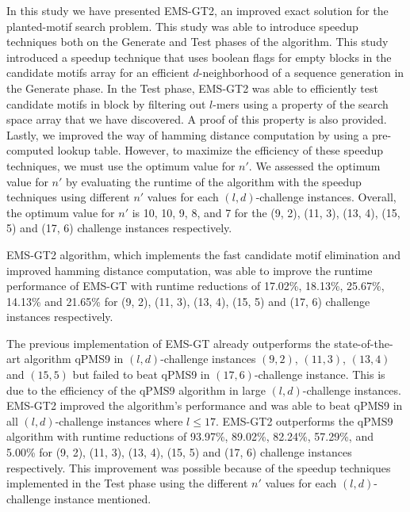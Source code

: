 
In this study we have presented EMS-GT2, an improved exact solution for the planted-motif search problem. This study was able to introduce speedup techniques both on the Generate and Test phases of the algorithm. This study introduced a speedup technique that uses boolean flags for empty blocks in the candidate motifs array for an efficient $d$-neighborhood of a sequence generation in the Generate phase. In the Test phase, EMS-GT2 was able to efficiently test candidate motifs in block by filtering out $l$-mers using a property of the search space array that we have discovered. A proof of this property is also provided. Lastly, we improved the way of hamming distance computation by using a pre-computed lookup table. However, to maximize the efficiency of these speedup techniques, we must use the optimum value for $n'$. We assessed the optimum value for $n'$ by evaluating the runtime of the algorithm with the speedup techniques using different $n'$ values for each $(l, d)$-challenge instances. Overall, the optimum value for $n'$ is 10, 10, 9, 8, and 7 for the (9, 2), (11, 3), (13, 4), (15, 5) and (17, 6) challenge instances respectively.

EMS-GT2 algorithm, which implements the fast candidate motif elimination and improved hamming distance computation, was able to improve the runtime performance of EMS-GT with runtime reductions of 17.02\%, 18.13\%, 25.67\%, 14.13\% and 21.65\% for (9, 2), (11, 3), (13, 4), (15, 5) and (17, 6) challenge instances respectively.

The previous implementation of EMS-GT already outperforms the state-of-the-art algorithm qPMS9 in $(l, d)$-challenge instances $(9, 2)$, $(11, 3)$, $(13, 4)$ and $(15, 5)$ but failed to beat qPMS9 in $(17, 6)$-challenge instance. This is due to the efficiency of the qPMS9 algorithm in large $(l, d)$-challenge instances. EMS-GT2 improved the algorithm's performance and was able to beat qPMS9 in all $(l, d)$-challenge instances where $l \leq 17$. EMS-GT2 outperforms the qPMS9 algorithm with runtime reductions of 93.97\%, 89.02\%, 82.24\%, 57.29\%, and 5.00\% for (9, 2), (11, 3), (13, 4), (15, 5) and (17, 6) challenge instances respectively. This improvement was possible because of the speedup techniques implemented in the Test phase using the different $n'$ values for each $(l, d)$-challenge instance mentioned.

